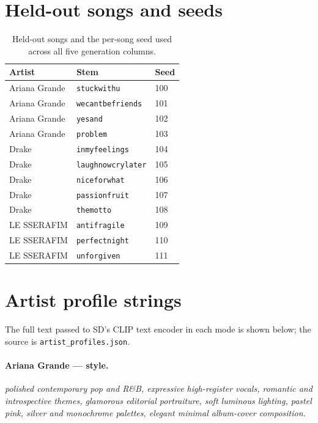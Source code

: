 \documentclass{article}
\begin{document}



\appendix

\section{Held-out songs and seeds}
\label{app:heldout}

\begin{table}[H]
\centering
\caption{Held-out songs and the per-song seed used across all five
generation columns.}
\begin{tabular}{lll}
\toprule
Artist & Stem & Seed \\
\midrule
Ariana Grande & \texttt{stuckwithu}        & 100 \\
Ariana Grande & \texttt{wecantbefriends}   & 101 \\
Ariana Grande & \texttt{yesand}            & 102 \\
Ariana Grande & \texttt{problem}           & 103 \\
Drake         & \texttt{inmyfeelings}      & 104 \\
Drake         & \texttt{laughnowcrylater}  & 105 \\
Drake         & \texttt{niceforwhat}       & 106 \\
Drake         & \texttt{passionfruit}      & 107 \\
Drake         & \texttt{themotto}          & 108 \\
LE SSERAFIM   & \texttt{antifragile}       & 109 \\
LE SSERAFIM   & \texttt{perfectnight}      & 110 \\
LE SSERAFIM   & \texttt{unforgiven}        & 111 \\
\bottomrule
\end{tabular}
\end{table}

\section{Artist profile strings}
\label{app:profiles}
The full text passed to SD's CLIP text encoder in each mode is shown below;
the source is \texttt{artist\_profiles.json}.

\paragraph{Ariana Grande --- style.}
\textit{polished contemporary pop and R\&B, expressive high-register vocals,
romantic and introspective themes, glamorous editorial portraiture, soft
luminous lighting, pastel pink, silver and monochrome palettes, elegant
minimal album-cover composition.}
\end{document}
